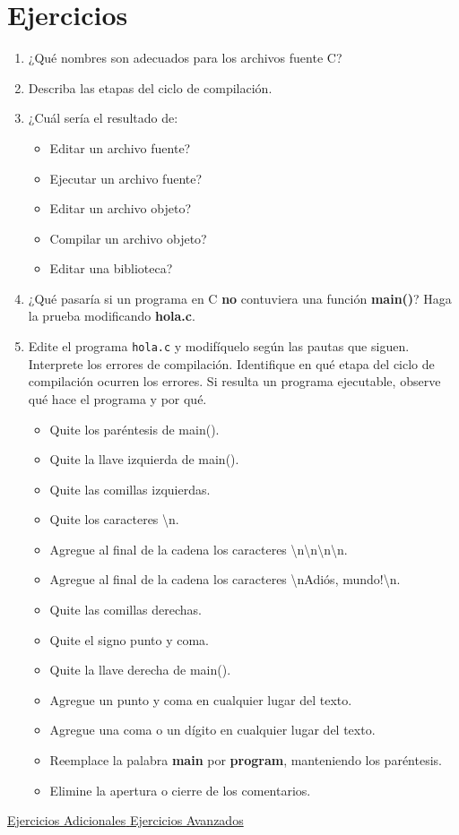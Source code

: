 \section{Ejercicios}
\begin{enumerate}
	\item ¿Qué nombres son adecuados para los archivos fuente C? 
	\item Describa las etapas del ciclo de compilación.
	\item ¿Cuál sería el resultado de: 
		\begin{itemize}
		\item Editar un archivo fuente? 
		\item Ejecutar un archivo fuente? 
		\item Editar un archivo objeto? 
		\item Compilar un archivo objeto? 
		\item Editar una biblioteca?
		\end{itemize}
	\item ¿Qué pasaría si un programa en C \textbf{no} contuviera una función \textbf{main()}? Haga la prueba modificando \textbf{hola.c}.
	\item Edite el programa \texttt{hola.c} y modifíquelo según las pautas que siguen. Interprete los errores de compilación. Identifique en qué etapa del ciclo de compilación ocurren los errores. Si resulta un programa ejecutable, observe qué hace el programa y por qué. 
		\begin{itemize}
		\item Quite los paréntesis de main(). 
		\item Quite la llave izquierda de main().
		\item Quite las comillas izquierdas.
		\item Quite los caracteres {\textquotedbl}{\textbackslash}n{\textquotedbl}.
		\item Agregue al final de la cadena los caracteres {\textquotedbl}{\textbackslash}n{\textbackslash}n{\textbackslash}n{\textbackslash}n{\textquotedbl}.
		\item Agregue al final de la cadena los caracteres {\textquotedbl}{\textbackslash}nAdiós, mundo!{\textbackslash}n{\textquotedbl}.
		\item Quite las comillas derechas.
		\item Quite el signo punto y coma. 
		\item Quite la llave derecha de main().
		\item Agregue un punto y coma en cualquier lugar del texto.
		\item Agregue una coma o un dígito en cualquier lugar del texto. 
		\item Reemplace la palabra \textbf{main} por \textbf{program}, manteniendo los paréntesis. 
		\item Elimine la apertura o cierre de los comentarios.
		\end{itemize}
	\end{enumerate}

\href{adicionales/adic1.html#adic1}{Ejercicios
Adicionales}\href{adicionales/adic1.html#adic1}{\textcolor{black}{
}}\href{adicionales/adic1.html#adic1}{\newline
}\newline
\href{adicionales/adic1.html#adic2}{Ejercicios Avanzados}
